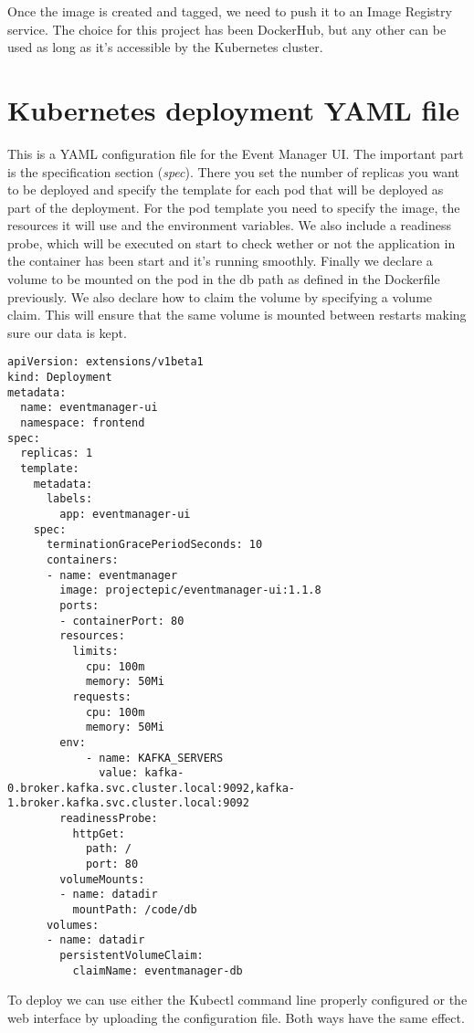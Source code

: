 Once the image is created and tagged, we need to push it to an Image Registry service. The choice for this project has been DockerHub, but any other can be used as long as it's accessible by the Kubernetes cluster.

\section{Kubernetes deployment YAML file}

This is a YAML configuration file for the Event Manager UI. The important part is the specification section (\textit{spec}). There you set the number of replicas you want to be deployed and specify the template for each pod that will be deployed as part of the deployment. For the pod template you need to specify the image, the resources it will use and the environment variables. We also include a readiness probe, which will be executed on start to check wether or not the application in the container has been start and it's running smoothly. Finally we declare a volume to be mounted on the pod in the db path as defined in the Dockerfile previously. We also declare how to claim the volume by specifying a volume claim. This will ensure that the same volume is mounted between restarts making sure our data is kept.

\begin{lstlisting}[float, floatplacement=H]
apiVersion: extensions/v1beta1
kind: Deployment
metadata:
  name: eventmanager-ui
  namespace: frontend
spec:
  replicas: 1
  template:
    metadata:
      labels:
        app: eventmanager-ui
    spec:
      terminationGracePeriodSeconds: 10
      containers:
      - name: eventmanager
        image: projectepic/eventmanager-ui:1.1.8
        ports:
        - containerPort: 80
        resources:
          limits:
            cpu: 100m
            memory: 50Mi
          requests:
            cpu: 100m
            memory: 50Mi
        env:
            - name: KAFKA_SERVERS
              value: kafka-0.broker.kafka.svc.cluster.local:9092,kafka-1.broker.kafka.svc.cluster.local:9092
        readinessProbe:
          httpGet:
            path: /
            port: 80
        volumeMounts:
        - name: datadir
          mountPath: /code/db
      volumes:
      - name: datadir
        persistentVolumeClaim:
          claimName: eventmanager-db
\end{lstlisting}

To deploy we can use either the Kubectl command line  properly configured or the web interface by uploading the configuration file. Both ways have the same effect.



